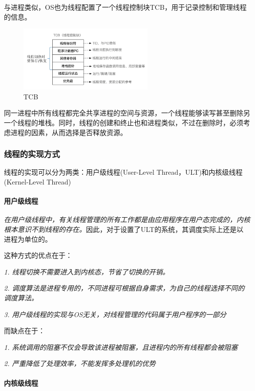     与进程类似，OS也为线程配置了一个线程控制块TCB，用于记录控制和管理线程的信息。

\begin{figure}[!htbp]
    \centering
    \includegraphics[width=0.6\textwidth]{image/chapter02/TCB.png}
    \caption{TCB}
\end{figure}

    同一进程中所有线程都完全共享进程的空间与资源，一个线程能够读写甚至删除另一个线程的堆栈。同时，线程的创建和终止也和进程类似，不过在删除时，必须考虑进程的因素，从而选择是否释放资源。

\subsubsection{线程的实现方式}

    线程的实现可以分为两类：用户级线程(User-Level Thread，ULT)和内核级线程(Kernel-Level Thread)

\paragraph{用户级线程}

    \emph{在用户级线程中，有关线程管理的所有工作都是由应用程序在用户态完成的，{\color{red}内核根本意识不到线程的存在}。}因此，对于设置了ULT的系统，其调度实际上还是以进程为单位的。

    这种方式的优点在于：

    \emph{1. 线程切换不需要进入到内核态，节省了切换的开销。}

    \emph{2. 调度算法是进程专用的，不同进程可根据自身需求，为自己的线程选择不同的调度算法。}

    \emph{3. 用户级线程的实现与OS无关，对线程管理的代码属于用户程序的一部分}

    而缺点在于：

    \emph{1. 系统调用的阻塞不仅会导致该进程被阻塞，且进程内的所有线程都会被阻塞}

    \emph{2. 严重降低了处理效率，不能发挥多处理机的优势}

\paragraph{内核级线程}

